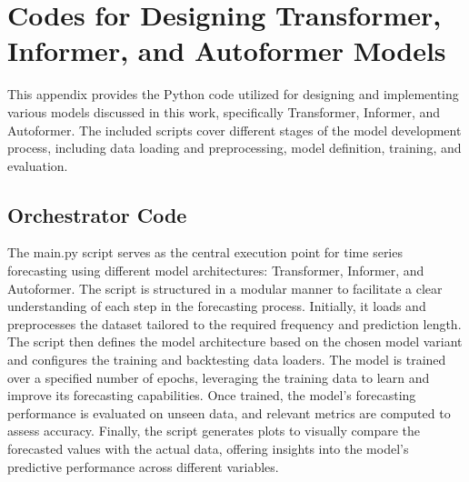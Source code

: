 


\chapter{Codes for Designing Transformer, Informer, and Autoformer Models}
{This appendix provides the Python code utilized for designing and implementing various models discussed in this work, specifically Transformer, Informer, and Autoformer. The included scripts cover different stages of the model development process, including data loading and preprocessing, model definition, training, and evaluation.}
\section{Orchestrator Code}

The main.py script serves as the central execution point for time series forecasting using different model architectures: Transformer, Informer, and Autoformer. The script is structured in a modular manner to facilitate a clear understanding of each step in the forecasting process. Initially, it loads and preprocesses the dataset tailored to the required frequency and prediction length. The script then defines the model architecture based on the chosen model variant and configures the training and backtesting data loaders. The model is trained over a specified number of epochs, leveraging the training data to learn and improve its forecasting capabilities. Once trained, the model's forecasting performance is evaluated on unseen data, and relevant metrics are computed to assess accuracy. Finally, the script generates plots to visually compare the forecasted values with the actual data, offering insights into the model's predictive performance across different variables.

